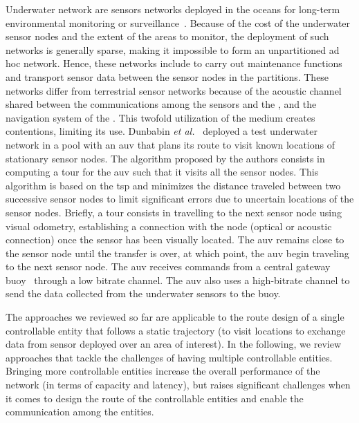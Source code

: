 Underwater network are sensors networks deployed in the oceans for long-term environmental monitoring or surveillance~\cite{partan2007survey,akyildiz2005underwater,dunbabin2006data}. Because of the cost of the underwater sensor nodes and the extent of the areas to monitor, the deployment of such networks is generally sparse, making it impossible to form an unpartitioned ad hoc network. Hence, these networks include  to carry out maintenance functions and transport sensor data between the sensor nodes in the partitions. These networks differ from terrestrial sensor networks because of the acoustic channel shared between the communications among the sensors and the , and the navigation system of the . This twofold utilization of the medium creates contentions, limiting its use. Dunbabin \textit{et al.}~\cite{dunbabin2006data} deployed a test underwater network in a pool with an \acrshort{auv} that plans its route to visit known locations of stationary sensor nodes. The algorithm proposed by the authors consists in computing a tour for the \acrshort{auv} such that it visits all the sensor nodes. This algorithm is based on the \acrshort{tsp} and minimizes the distance traveled between two successive sensor nodes to limit significant errors due to uncertain locations of the sensor nodes. Briefly, a tour consists in travelling to the next sensor node using visual odometry, establishing a connection with the node (\eg optical or acoustic connection) once the sensor has been visually located. The \acrshort{auv} remains close to the sensor node until the transfer is over, at which point, the \acrshort{auv} begin traveling to the next sensor node. The \acrshort{auv} receives commands from a central gateway buoy~\cite{marn2005evolution} through a low bitrate channel. The \acrshort{auv} also uses a high-bitrate channel to send the data collected from the underwater sensors to the buoy.

The approaches we reviewed so far are applicable to the route design of a single controllable entity that follows a static trajectory (\eg to visit locations to exchange data from sensor deployed over an area of interest). In the following, we review approaches that tackle the challenges of having multiple controllable entities. Bringing more controllable entities increase the overall performance of the network (\eg in terms of capacity and latency), but raises significant challenges when it comes to design the route of the controllable entities and enable the communication among the entities.

